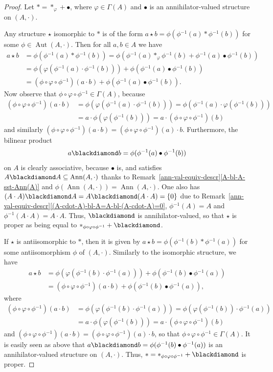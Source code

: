 \documentclass{jonasart}
\newcommand{\bl}{\bullet}
\newcommand{\G}{\Gamma}
\newcommand{\m}{{}^{-1}}
\newcommand{\sst}{\subseteq}
\newcommand{\vf}{\varphi}
\DeclareMathOperator{\Ann}{Ann}
\DeclareMathOperator{\Aut}{Aut}
\begin{document}
	\begin{proof}
		Let $*=*_\vf+\bl$, where $\vf\in\G(A)$ and $\bl$ is an annihilator-valued structure on $(A,\cdot)$.

		Any structure $\star$ isomorphic to $*$ is of the form $a\star b=\phi(\phi\m(a)*\phi\m(b))$ for some $\phi\in\Aut(A,\cdot)$. Then for all $a,b\in A$ we have
		\begin{align*}
			a\star b&=\phi(\phi\m(a)*\phi\m(b))=\phi(\phi\m(a)*_\vf\phi\m(b)+\phi\m(a)\bl\phi\m(b))\\
			&=\phi(\vf(\phi\m(a)\cdot\phi\m(b)))+\phi(\phi\m(a)\bl\phi\m(b))\\
			&=(\phi\circ\vf\circ\phi\m)(a\cdot b)+\phi(\phi\m(a)\bl\phi\m(b)).
		\end{align*}
		Now observe that $\phi\circ\vf\circ\phi\m\in\G(A)$, because
		\begin{align*}
			(\phi\circ\vf\circ\phi\m)(a\cdot b)&=\phi(\vf(\phi\m(a)\cdot \phi\m(b)))=\phi(\phi\m(a)\cdot\vf(\phi\m(b)))\\
			&=a\cdot\phi(\vf(\phi\m(b)))=a\cdot(\phi\circ\vf\circ\phi\m)(b)
		\end{align*}
		and similarly $(\phi\circ\vf\circ\phi\m)(a\cdot b)=(\phi\circ\vf\circ\phi\m)(a)\cdot b$. Furthermore, the bilinear product
        \[
            a\blackdiamond b=\phi(\phi\m(a)\bl\phi\m(b))
        \]
        on $A$ is clearly associative, because $\bl$ is, and satisfies $A\blackdiamond A\sst\Ann(A,\cdot)$ thanks to Remark~\ref{ann-val-equiv-descr}\eqref{A-bl-A-sst-Ann(A)} and $\phi(\Ann(A,\cdot))=\Ann(A,\cdot)$. One also has
		$(A\cdot A)\blackdiamond A=A\blackdiamond (A\cdot A)=\{0\}$ due to Remark~\ref{ann-val-equiv-descr}\eqref{(A-cdot-A)-bl-A=A-bl-(A-cdot-A)=0}, $\phi\m(A)=A$ and $\phi\m(A\cdot A)=A\cdot A$. Thus, $\blackdiamond$ is annihilator-valued, so that $\star$ is proper as being equal to $*_{\phi\circ\vf\circ\phi\m}+\blackdiamond$.

		If $\star$ is antiisomorphic to $*$, then it is given by $a\star b=\phi(\phi\m(b)*\phi\m(a))$ for some antiisomorphism $\phi$ of $(A,\cdot)$. Similarly to the isomorphic structure, we have
		\begin{align*}
			a\star b
			&=\phi(\vf(\phi\m(b)\cdot\phi\m(a)))+\phi(\phi\m(b)\bl\phi\m(a))\\
			&=(\phi\circ\vf\circ\phi\m)(a\cdot b)+\phi(\phi\m(b)\bl\phi\m(a)),
		\end{align*}
		where
		\begin{align*}
			(\phi\circ\vf\circ\phi\m)(a\cdot b)&=\phi(\vf(\phi\m(b)\cdot \phi\m(a)))=\phi(\vf(\phi\m(b))\cdot\phi\m(a))\\
			&=a\cdot\phi(\vf(\phi\m(b)))=a\cdot(\phi\circ\vf\circ\phi\m)(b)
		\end{align*}
		and $(\phi\circ\vf\circ\phi\m)(a\cdot b)=(\phi\circ\vf\circ\phi\m)(a)\cdot b$, so that $\phi\circ\vf\circ\phi\m\in\G(A)$. It is easily seen as above that $a\blackdiamond b=\phi(\phi\m(b)\bl\phi\m(a))$ is an annihilator-valued structure on $(A,\cdot)$. Thus, $*=*_{\phi\circ\vf\circ\phi\m}+\blackdiamond$ is proper.
	\end{proof}
\end{document}

